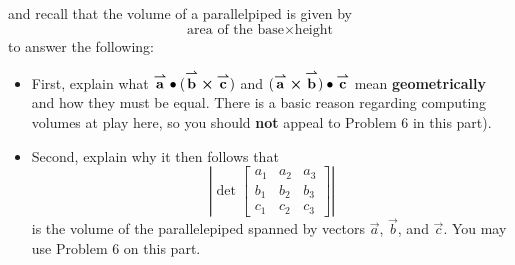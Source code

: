 \documentclass[nooutcomes,handout]{ximera}
\begin{document}
\begin{problem}
\begin{image}
  \end{image}
    and recall that the volume of a parallelpiped is given by
    \[
    \text{area of the base}\times\text{height}
    \]
    to answer the following:

    \begin{itemize}
    \item First, explain what ${\overset{\boldsymbol{\rightharpoonup}}{\mathbf{a}}}\bullet({\overset{\boldsymbol{\rightharpoonup}}{\mathbf{b}}}\boldsymbol\times{\overset{\boldsymbol{\rightharpoonup}}{\mathbf{c}}})$ and
      $({\overset{\boldsymbol{\rightharpoonup}}{\mathbf{a}}}\boldsymbol\times{\overset{\boldsymbol{\rightharpoonup}}{\mathbf{b}}})\bullet{\overset{\boldsymbol{\rightharpoonup}}{\mathbf{c}}}$ mean \textbf{geometrically}
      and how they must be equal. There is a basic reason regarding
      computing volumes at play here, so you should \textbf{not}
      appeal to Problem 6 in this part).
    \item Second, explain why it then follows that 
      \[
      \left |\det\begin{bmatrix}
      a_1 & a_2 & a_3\\
      b_1 & b_2 & b_3\\
      c_1 & c_2 & c_3
      \end{bmatrix}\right|
      \]
      is the volume of the parallelepiped spanned by vectors $\vec{a}$,
      $\vec{b}$, and $\vec{c}$. You may use Problem 6 on this part.
    \end{itemize}
\end{problem}
\end{document}

